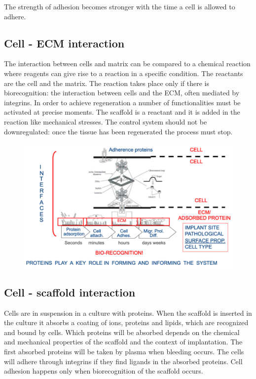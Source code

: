 		The strength of adhesion becomes stronger with the time a cell is allowed to adhere.

	\subsection{Cell - ECM interaction}
	The interaction between cells and matrix can be compared to a chemical reaction where reagents can give rise to a reaction in a specific condition.
	The reactants are the cell and the matrix.
	The reaction takes place only if there is biorecognition: the interaction between cells and the ECM, often mediated by integrins.
	In order to achieve regeneration a number of functionalities must be activated at precise moments.
	The scaffold is a reactant and it is added in the reaction like mechanical stresses.
	The control system should not be downregulated: once the tissue has been regenerated the process must stop.

	\begin{figure}[h]
	\includegraphics[width=1\textwidth]{interfaces}
	\caption{\label{fig:interfaces}}
	\end{figure}

	\subsection{Cell - scaffold interaction}
	Cells are in suspension in a culture with proteins.
	When the scaffold is inserted in the culture it absorbs a coating of ions, proteins and lipids, which are recognized and bound by cells.
	Which proteins will be absorbed depends on the chemical and mechanical properties of the scaffold and the context of implantation.
	The first absorbed proteins will be taken by plasma when bleeding occurs.
	The cells will adhere through integrins if they find ligands in the absorbed proteins.
	Cell adhesion happens only when biorecognition of the scaffold occurs.

